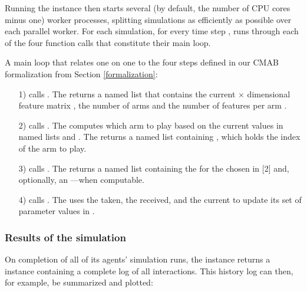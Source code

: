 \documentclass{jss}
\begin{document}
Running the  instance then starts several (by default, the number of CPU cores minus one) worker processes, splitting simulations as efficiently as possible over each parallel worker. For each simulation, for every time step ,  runs through each of the four function calls that constitute their main loop.

A main loop that relates one on one to the four steps defined in our CMAB formalization from Section \ref{formalization}:

\begin{enumerate}
         \item[1)]  calls . The  returns a named list that contains the current  $\times$  dimensional feature matrix , the number of arms  and the number of features per arm .
         \item[2)]  calls . The  computes which arm to play based on the current values in named lists  and . The  returns a named list containing , which holds the index of the arm to play.
         \item[3)]  calls . The  returns a named list containing the  for the  chosen in [2] and, optionally, an ---when computable.
         \item[4)]  calls . The  uses the  taken, the  received, and the current  to update its set of parameter values in .
\end{enumerate}

\subsubsection{Results of the simulation}

On completion of all of its agents' simulation runs, the  instance returns a  instance containing a complete log of all interactions. This history log can then, for example, be summarized and plotted:
\end{document}
